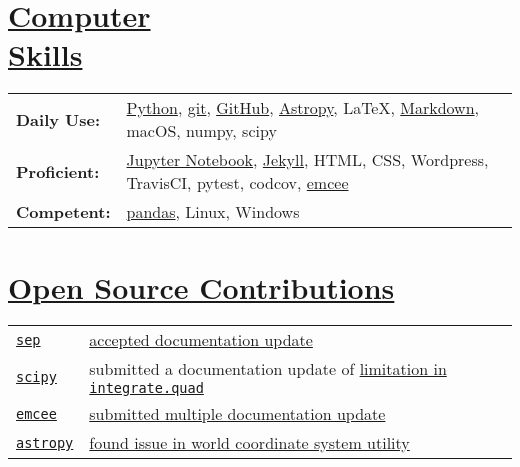 \documentclass[margin]{res}
\begin{document}
\begin{resume}
\section{\href{https://github.com/benjaminrose}{Computer \\Skills}}
 \hspace{-1em}
 \begin{tabular}{l p{4.2in}}
{\bf Daily Use:} & \href{https://www.python.org}{Python}, \href{https://git-scm.com}{git}, \href{https://github.com/benjaminrose}{GitHub}, \href{http://www.astropy.org}{Astropy}, \LaTeX, \href{http://daringfireball.net/projects/markdown/}{Markdown}, macOS, numpy, scipy\\
{\bf Proficient:} &  \href{http://jupyter.org}{Jupyter Notebook}, \href{https://jekyllrb.com}{Jekyll}, HTML, CSS, Wordpress, TravisCI, pytest, codcov, \href{http://dan.iel.fm/emcee/current/}{emcee}\\
{\bf Competent:} & \href{http://pandas.pydata.org}{pandas}, Linux, Windows %
\end{tabular}

\section{\href{https://github.com/benjaminrose}{Open Source Contributions}}
\hspace{-1em}
\begin{tabular}{l p{4.9in}}
\href{http://sep.readthedocs.io/en/v1.0.x/}{\texttt{sep}} & \href{https://github.com/kbarbary/sep/commit/612033788bcce44f110a87e1b54bb70eea9960c2}{accepted documentation update} \\

\href{https://www.scipy.org}{\texttt{scipy}} & submitted a documentation update of \href{https://github.com/scipy/scipy/issues/7204}{limitation in \texttt{integrate.quad}} \\

\href{http://dan.iel.fm/emcee/current/}{\texttt{emcee}} & \href{https://github.com/dfm/emcee/pull/212}{submitted multiple documentation update} \\

\href{http://www.astropy.org}{\texttt{astropy}} & \href{https://github.com/astropy/astropy/issues/4976}{found issue in world coordinate system utility} 


\end{tabular}
\end{resume}
\end{document}
